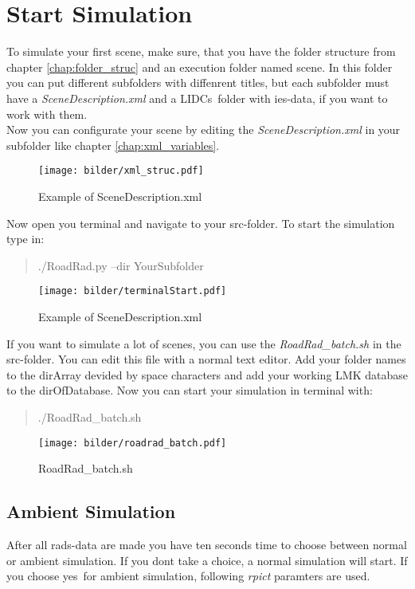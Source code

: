 \documentclass[10pt,a4paper]{report}
\begin{document}
\chapter{Start Simulation}

To simulate your first scene, make sure, that you have the folder structure from chapter \ref{chap:folder_struc} and an execution folder named \glqq scene\grqq. In this folder you can put different subfolders with diffenrent titles, but each subfolder must have a \textit{SceneDescription.xml} and a \glqq LIDCs\grqq\ folder with ies-data, if you want to work with them.\\
Now you can configurate your scene by editing the \textit{SceneDescription.xml} in your subfolder like chapter \ref{chap:xml_variables}.

\begin{figure}[H]
\texttt{[image: bilder/xml\_struc.pdf]} 
\caption{Example of SceneDescription.xml}
\end{figure}

Now open you terminal and navigate to your src-folder. To start the simulation type in:

\begin{quote}
./RoadRad.py --dir YourSubfolder
\end{quote}

\begin{figure}[H]
\centering
\texttt{[image: bilder/terminalStart.pdf]} 
\caption{Example of SceneDescription.xml}
\end{figure}

If you want to simulate a lot of scenes, you can use the \textit{RoadRad\_batch.sh} in the src-folder. You can edit this file with a normal text editor. Add your folder names to the dirArray devided by space characters and add your working LMK database to the dirOfDatabase. Now you can start your simulation in terminal with:

\begin{quote}
./RoadRad\_batch.sh
\end{quote}

\begin{figure}[H]
\texttt{[image: bilder/roadrad\_batch.pdf]} 
\caption{RoadRad\_batch.sh}
\end{figure}

\section{Ambient Simulation}
After all rads-data are made you have ten seconds time to choose between normal or ambient simulation. If you dont take a choice, a normal simulation will start. If you choose \glqq yes\grqq\ for ambient simulation, following \textit{rpict} paramters are used.
\end{document}
